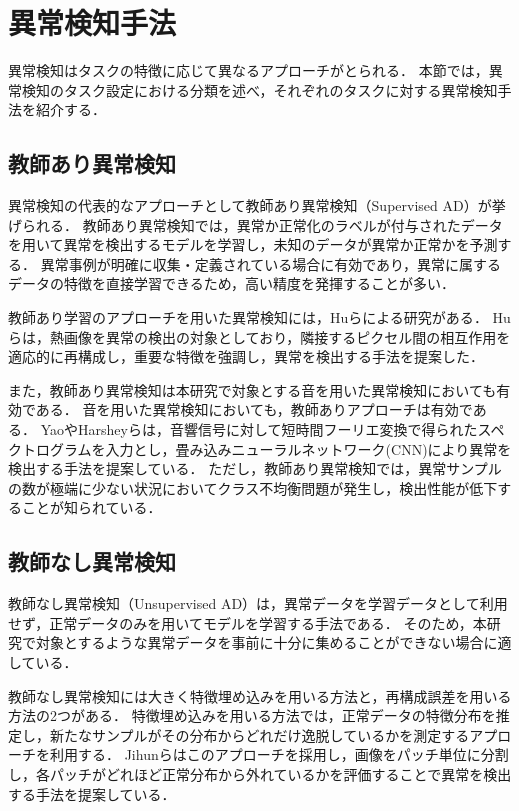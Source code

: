 \documentclass[../main]{subfiles}
\begin{document}
\section{異常検知手法}
\label{sec:related_work_anomaly}
異常検知はタスクの特徴に応じて異なるアプローチがとられる．
本節では，異常検知のタスク設定における分類を述べ，それぞれのタスクに対する異常検知手法を紹介する．
\subsection{教師あり異常検知}
異常検知の代表的なアプローチとして教師あり異常検知（Supervised AD）が挙げられる．
教師あり異常検知では，異常か正常化のラベルが付与されたデータを用いて異常を検出するモデルを学習し，未知のデータが異常か正常かを予測する．
異常事例が明確に収集・定義されている場合に有効であり，異常に属するデータの特徴を直接学習できるため，高い精度を発揮することが多い．

教師あり学習のアプローチを用いた異常検知には，Huらによる研究がある\cite{Hu}．
Huらは，熱画像を異常の検出の対象としており，隣接するピクセル間の相互作用を適応的に再構成し，重要な特徴を強調し，異常を検出する手法を提案した．

また，教師あり異常検知は本研究で対象とする音を用いた異常検知においても有効である．
音を用いた異常検知においても，教師ありアプローチは有効である．
YaoやHarsheyらは，音響信号に対して短時間フーリエ変換で得られたスペクトログラムを入力とし，畳み込みニューラルネットワーク(CNN)\cite{cnn}により異常を検出する手法を提案している\cite{hershey}\cite{yao}．
ただし，教師あり異常検知では，異常サンプルの数が極端に少ない状況においてクラス不均衡問題が発生し，検出性能が低下することが知られている\cite{nilanon}．
\subsection{教師なし異常検知}
教師なし異常検知（Unsupervised AD）は，異常データを学習データとして利用せず，正常データのみを用いてモデルを学習する手法である．
そのため，本研究で対象とするような異常データを事前に十分に集めることができない場合に適している．

教師なし異常検知には大きく特徴埋め込みを用いる方法と，再構成誤差を用いる方法の2つがある．
特徴埋め込みを用いる方法では，正常データの特徴分布を推定し，新たなサンプルがその分布からどれだけ逸脱しているかを測定するアプローチを利用する．
Jihunらはこのアプローチを採用し，画像をパッチ単位に分割し，各パッチがどれほど正常分布から外れているかを評価することで異常を検出する手法を提案している\cite{jihun}．
\end{document}

